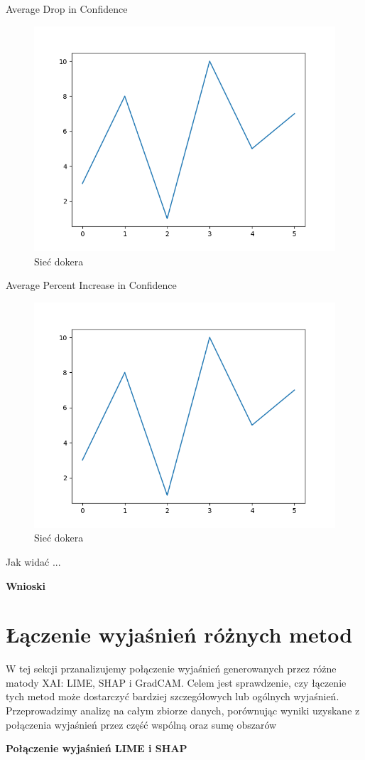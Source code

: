 Average Drop in Confidence
\begin{figure}
  \centering\includegraphics[width=.6\textwidth]{images/example}
\caption{Sieć dokera \cite{docker_compose_reference}}  \label{rys:network}
\end{figure}

Average Percent Increase in Confidence
\begin{figure}
  \centering\includegraphics[width=.6\textwidth]{images/example}
\caption{Sieć dokera \cite{docker_compose_reference}}  \label{rys:network}
\end{figure}

Jak widać ...

\textbf{Wnioski}

\section*{Łączenie wyjaśnień różnych metod}
W tej sekcji przanalizujemy połączenie wyjaśnień generowanych przez różne matody XAI: LIME, SHAP i GradCAM.
Celem jest sprawdzenie, czy łączenie tych metod może dostarczyć bardziej szczegółowych lub ogólnych wyjaśnień.
Przeprowadzimy analizę na całym zbiorze danych, porównując wyniki uzyskane z połączenia wyjaśnień przez część wspólną oraz sumę obszarów

\textbf{Połączenie wyjaśnień LIME i SHAP}

